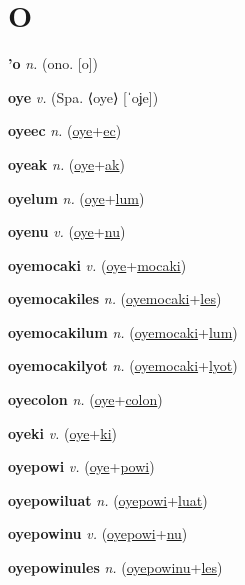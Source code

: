 \section{O}

\textbf{\hypertarget{'o}{'o}} \textit{n.} (ono. [o])


\textbf{\hypertarget{oye}{oye}} \textit{v.} (Spa. ⟨oye⟩ [ˈoʝe])


\textbf{\hypertarget{oyeec}{oyeec}} \textit{n.} (\hyperlink{oye}{oye}+\allowbreak \hyperlink{ec}{ec})


\textbf{\hypertarget{oyeak}{oyeak}} \textit{n.} (\hyperlink{oye}{oye}+\allowbreak \hyperlink{ak}{ak})


\textbf{\hypertarget{oyelum}{oyelum}} \textit{n.} (\hyperlink{oye}{oye}+\allowbreak \hyperlink{lum}{lum})


\textbf{\hypertarget{oyenu}{oyenu}} \textit{v.} (\hyperlink{oye}{oye}+\allowbreak \hyperlink{nu}{nu})


\textbf{\hypertarget{oyemocaki}{oyemocaki}} \textit{v.} (\hyperlink{oye}{oye}+\allowbreak \hyperlink{mocaki}{mocaki})


\textbf{\hypertarget{oyemocakiles}{oyemocakiles}} \textit{n.} (\hyperlink{oyemocaki}{oyemocaki}+\allowbreak \hyperlink{les}{les})


\textbf{\hypertarget{oyemocakilum}{oyemocakilum}} \textit{n.} (\hyperlink{oyemocaki}{oyemocaki}+\allowbreak \hyperlink{lum}{lum})


\textbf{\hypertarget{oyemocakilyot}{oyemocakilyot}} \textit{n.} (\hyperlink{oyemocaki}{oyemocaki}+\allowbreak \hyperlink{lyot}{lyot})


\textbf{\hypertarget{oyecolon}{oyecolon}} \textit{n.} (\hyperlink{oye}{oye}+\allowbreak \hyperlink{colon}{colon})


\textbf{\hypertarget{oyeki}{oyeki}} \textit{v.} (\hyperlink{oye}{oye}+\allowbreak \hyperlink{ki}{ki})


\textbf{\hypertarget{oyepowi}{oyepowi}} \textit{v.} (\hyperlink{oye}{oye}+\allowbreak \hyperlink{powi}{powi})


\textbf{\hypertarget{oyepowiluat}{oyepowiluat}} \textit{n.} (\hyperlink{oyepowi}{oyepowi}+\allowbreak \hyperlink{luat}{luat})


\textbf{\hypertarget{oyepowinu}{oyepowinu}} \textit{v.} (\hyperlink{oyepowi}{oyepowi}+\allowbreak \hyperlink{nu}{nu})


\textbf{\hypertarget{oyepowinules}{oyepowinules}} \textit{n.} (\hyperlink{oyepowinu}{oyepowinu}+\allowbreak \hyperlink{les}{les})


